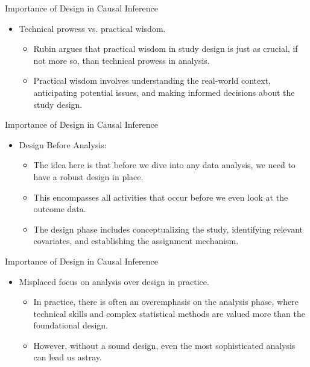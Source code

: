 \documentclass{beamer}
\begin{document}
\begin{frame}{Importance of Design in Causal Inference}
  \begin{itemize}
    \item Technical prowess vs. practical wisdom.
    	\begin{itemize}
	\item Rubin argues that practical wisdom in study design is just as crucial, if not more so, than technical prowess in analysis. 
	\item Practical wisdom involves understanding the real-world context, anticipating potential issues, and making informed decisions about the study design.
	\end{itemize}
  \end{itemize}
\end{frame}





\begin{frame}{Importance of Design in Causal Inference}
  \begin{itemize}

    \item Design Before Analysis:  
    	\begin{itemize}
	\item The idea here is that before we dive into any data analysis, we need to have a robust design in place. 
	\item This encompasses all activities that occur before we even look at the outcome data. 
	\item The design phase includes conceptualizing the study, identifying relevant covariates, and establishing the assignment mechanism.
	\end{itemize}
  \end{itemize}
\end{frame}





\begin{frame}{Importance of Design in Causal Inference}
  \begin{itemize}
    \item Misplaced focus on analysis over design in practice.
    	\begin{itemize}
	\item In practice, there is often an overemphasis on the analysis phase, where technical skills and complex statistical methods are valued more than the foundational design. 
	\item However, without a sound design, even the most sophisticated analysis can lead us astray.
	\end{itemize}
\end{itemize}

\end{frame}
\end{document}
